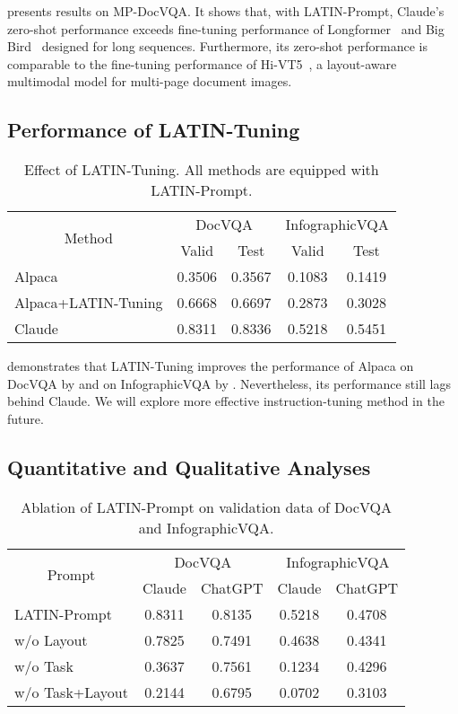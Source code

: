 \documentclass[letterpaper]{article} \usepackage{aaai24_preprint}  \usepackage{times}  \usepackage{helvet}  \usepackage{courier}  \usepackage[hyphens]{url}  \usepackage{graphicx} \urlstyle{rm} \def\UrlFont{\rm}  \usepackage{natbib}  \usepackage{caption} \frenchspacing  \setlength{\pdfpagewidth}{8.5in} \setlength{\pdfpageheight}{11in} \usepackage{algorithm}
\begin{document}
 presents results on MP-DocVQA.
It shows that, with LATIN-Prompt, Claude's zero-shot performance exceeds fine-tuning performance of Longformer~\cite{beltagyLongformer2020} and Big Bird~\cite{zaheerBigBirdTransformers2021} designed for long sequences.
Furthermore, its zero-shot performance is comparable to the fine-tuning performance of Hi-VT5~\cite{titoMulti-PageDocVQAHi-VT52023}, a layout-aware multimodal model for multi-page document images.

\subsection{Performance of LATIN-Tuning}
\begin{table}[t]
\small
\centering
\begin{tabular}{@{}lcccc@{}}
\toprule
\multicolumn{1}{c}{\multirow{2}{*}{Method}} & \multicolumn{2}{c}{DocVQA} & \multicolumn{2}{c}{InfographicVQA} \\
\multicolumn{1}{c}{}&Valid&Test&Valid&Test\\
\midrule
Alpaca&0.3506&0.3567&0.1083&0.1419\\
Alpaca+LATIN-Tuning&0.6668&0.6697&0.2873&0.3028\\
Claude&0.8311&0.8336&0.5218&0.5451\\
\bottomrule
\end{tabular}
\caption{
Effect of LATIN-Tuning. All methods are equipped with LATIN-Prompt.
}
\label{tab:exp_latin-tuning}
\end{table}
 demonstrates that LATIN-Tuning improves the performance of Alpaca on DocVQA by  and on InfographicVQA by .
Nevertheless, its performance still lags behind Claude.
We will explore more effective instruction-tuning method in the future.

\subsection{Quantitative and Qualitative Analyses}
\begin{table}[t]
\small
\centering
\begin{tabular}{@{}lcccc@{}}
\toprule
\multicolumn{1}{c}{\multirow{2}{*}{Prompt}} & \multicolumn{2}{c}{DocVQA} & \multicolumn{2}{c}{InfographicVQA} \\
\multicolumn{1}{c}{}&Claude&ChatGPT&Claude&ChatGPT\\
\midrule
LATIN-Prompt&0.8311&0.8135&0.5218&0.4708\\
w/o Layout&0.7825&0.7491&0.4638&0.4341\\
w/o Task&0.3637&0.7561&0.1234&0.4296\\
w/o Task+Layout&0.2144&0.6795&0.0702&0.3103\\
\bottomrule
\end{tabular}
\caption{
Ablation of LATIN-Prompt on validation data of DocVQA and InfographicVQA.
}
\label{tab:ablation_study_claude}
\end{table}
\end{document}
